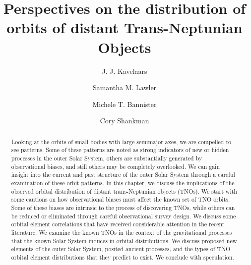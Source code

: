 \documentclass[preprint]{aastex62}
\begin{document}
\title{Perspectives on the distribution of orbits of distant Trans-Neptunian Objects}

\author[0000-0001-7032-5255]{J. J. Kavelaars}


\author[0000-0001-5368-386X]{Samantha M. Lawler}

\author[0000-0003-3257-4490]{Michele T. Bannister}

\author[0000-0002-3507-5964]{Cory Shankman}


\begin{abstract}


Looking at the orbits of small bodies with large semimajor axes, we are compelled to see
patterns. 
Some of these patterns are noted as strong indicators of new or hidden processes in the outer Solar System, others are substantially generated by observational biases, and still others may be completely overlooked. 
We can gain insight into the current and past structure of the outer Solar System through a careful examination of these orbit patterns.
In this chapter, we discuss the implications of the observed orbital distribution of distant trans-Neptunian objects (TNOs).  
We start with some cautions on how observational biases must affect the known set of TNO orbits. 
Some of these biases are intrinsic to the process of discovering TNOs, while others can be reduced or eliminated through careful observational survey design.
We discuss some orbital element correlations that have received considerable attention in the recent literature. 
We examine the known TNOs in the context of the gravitational processes that the known Solar System induces in orbital distributions. 
We discuss proposed new elements of the outer Solar System, posited ancient processes, and the types of TNO orbital element distributions that they predict to exist.  
We conclude with speculation.

\end{abstract}
\end{document}
